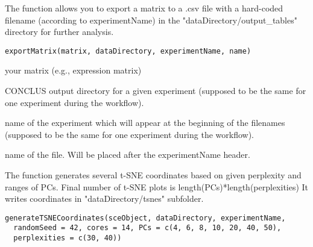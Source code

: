 \documentclass[a4paper]{book}
\begin{document}
%
\begin{Description}\relax
The function allows you to export a matrix to a .csv file with a hard-coded filename (according to experimentName) 
in the "dataDirectory/output\_tables" directory for further analysis.
\end{Description}
%
\begin{Usage}
\begin{verbatim}
exportMatrix(matrix, dataDirectory, experimentName, name)
\end{verbatim}
\end{Usage}
%
\begin{Arguments}
\begin{ldescription}
\item[\code{matrix}] your matrix (e.g., expression matrix)

\item[\code{dataDirectory}] CONCLUS output directory for a given experiment (supposed to be the same for one experiment during the workflow).

\item[\code{experimentName}] name of the experiment which will appear at the beginning of the filenames 
(supposed to be the same for one experiment during the workflow).

\item[\code{name}] name of the file. Will be placed after the experimentName header.
\end{ldescription}
\end{Arguments}
%
\begin{Description}\relax
The function generates several t-SNE coordinates based on given perplexity and ranges of PCs. 
Final number of t-SNE plots is length(PCs)*length(perplexities)
It writes coordinates in "dataDirectory/tsnes" subfolder.
\end{Description}
%
\begin{Usage}
\begin{verbatim}
generateTSNECoordinates(sceObject, dataDirectory, experimentName,
  randomSeed = 42, cores = 14, PCs = c(4, 6, 8, 10, 20, 40, 50),
  perplexities = c(30, 40))
\end{verbatim}
\end{Usage}
%
\end{document}
